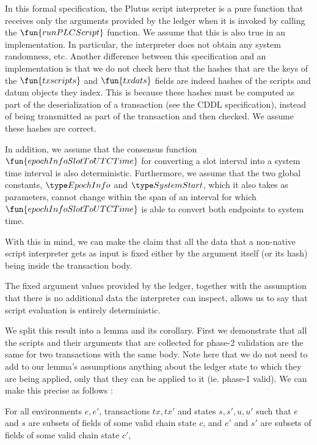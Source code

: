 \begin{property}
  \label{prop:fixed-inputs}

In this formal specification, the Plutus script
interpreter is a pure function that receives only the arguments provided by the ledger when it is
invoked by calling the $\fun{runPLCScript}$ function. We assume that this is
also true in an implementation. In particular, the interpreter does not
obtain any system randomness, etc. Another difference between this specification and
an implementation is that we do not check here that the hashes that are the keys of the
$\fun{txscripts}$ and $\fun{txdats}$ fields are indeed hashes of the scripts and
datum objects they index. This is because these hashes must be computed as part of
the deserialization of a transaction (see the CDDL specification),
instead of being transmitted as part of the transaction and then checked. We
assume these hashes are correct.

In addition, we assume that the consensus
function $\fun{epochInfoSlotToUTCTime}$ for converting a slot interval into a
system time interval is also deterministic. Furthermore, we assume that the two global
constants, $\EpochInfo$ and $\SystemStart$, which it also takes as parameters,
cannot change within the span of an interval for which $\fun{epochInfoSlotToUTCTime}$
is able to convert both endpoints to system time.

With this in mind, we can make the claim that
all the data that a non-native script interpreter gets as input
is fixed either by the argument itself (or its hash) being inside the transaction body.

The fixed argument values provided by the ledger, together with the assumption that there
is no additional data the interpreter can inspect, allows us to say that
script evaluation is entirely deterministic.

We split this result into a lemma and its corollary.
First we demonstrate that all the scripts and their arguments that are
collected for phase-2 validation are the same for two transactions with the same body.
Note here that we do not need to add to our lemma's assumptions anything about the ledger
state to which they are being applied, only that they can be applied to it
(ie. phase-1 valid). We can make this precise as follows :

\begin{lemma}
  For all environments $e, e'$, transactions $tx, tx'$ and states $s, s', u, u'$ such that
  $e$ and $s$ are subsets of fields of some valid chain state $c$, and
  $e'$ and $s'$ are subsets of fields of some valid chain state $c'$,


\end{lemma}
\end{property}
